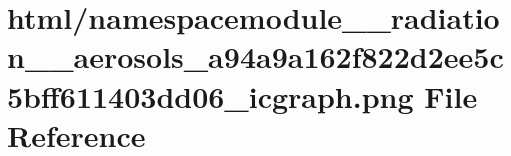 \hypertarget{namespacemodule____radiation____aerosols__a94a9a162f822d2ee5c5bff611403dd06__icgraph_8png}{}\section{html/namespacemodule\+\_\+\+\_\+radiation\+\_\+\+\_\+aerosols\+\_\+a94a9a162f822d2ee5c5bff611403dd06\+\_\+icgraph.png File Reference}
\label{namespacemodule____radiation____aerosols__a94a9a162f822d2ee5c5bff611403dd06__icgraph_8png}
